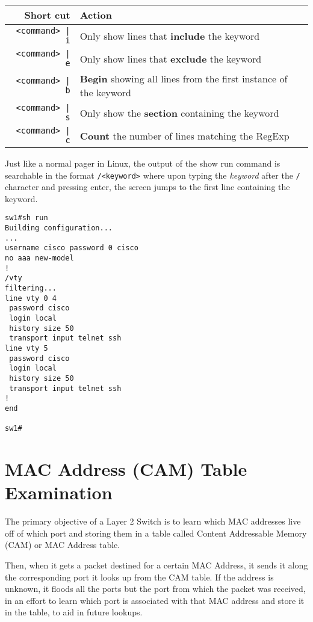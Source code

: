 \noindent
\begin{center}
	\begin{tabular}{rl}
		\toprule
		\textbf{Short cut} &\textbf{Action} \\
		\midrule
		\verb:<command> | i:	&Only show lines that \textbf{include} the keyword\\
		\verb:<command> | e:	&Only show lines that \textbf{exclude} the keyword\\
		\verb:<command> | b:	&\textbf{Begin} showing all lines from the first instance of the keyword\\
		\verb:<command> | s:	&Only show the \textbf{section} containing the keyword\\
		\verb:<command> | c:	&\textbf{Count} the number of lines matching the RegExp\\
		\bottomrule
	\end{tabular}
\end{center}

\noindent
Just like a normal pager in Linux, the output of the show run command is searchable in the format \verb|/<keyword>| where upon typing the \textit{keyword} after the \verb|/| character and pressing enter, the screen jumps to the first line containing the keyword. 

\vspace{-15pt}
\begin{verbatim}
sw1#sh run
Building configuration...
...
username cisco password 0 cisco
no aaa new-model
!
/vty
filtering...
line vty 0 4
 password cisco
 login local
 history size 50
 transport input telnet ssh
line vty 5
 password cisco
 login local
 history size 50
 transport input telnet ssh
!
end

sw1#
\end{verbatim}
\vspace{-10pt}

\section{MAC Address (CAM) Table Examination}
The primary objective of a Layer 2 Switch is to learn which MAC addresses live off of which port and storing them in a table called Content Addressable Memory (CAM) or MAC Address table. 

Then, when it gets a packet destined for a certain MAC Address, it sends it along the corresponding port it looks up from the CAM table. If the address is unknown, it floods all the ports but the port from which the packet was received, in an effort to learn which port is associated with that MAC address and store it in the table, to aid in future lookups. 

